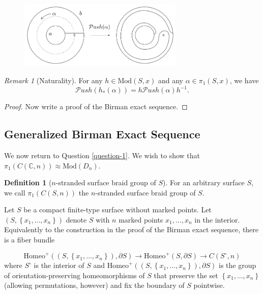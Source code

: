 \documentclass[reqno]{amsart}
\theoremstyle{definition}
\newtheorem{definition}[theorem]{Definition}
\theoremstyle{remark}
\newtheorem*{remark}{Remark}
\newcommand{\Mod}{{\mathrm{Mod}}}
\newcommand{\Homeo}{{\mathrm{Homeo}}}
\newcommand{\Push}{{\mathcal{P}}ush}
\begin{document}
 \begin{figure}[htpb]
     \centering
     \includegraphics[width=0.7\textwidth]{push-point-map.png}
     \label{fig:push-point-map-png}
 \end{figure}

 \begin{remark}[Naturality]
     For any $h \in \Mod (S,x)$ and any
     $\alpha \in \pi_1 \left( S,x \right) $, we have
     \[
     \Push \left( h_* \left( \alpha \right)  \right) 
     = h\Push \left( \alpha \right) h^{-1}.
     \] 
 \end{remark}



 \begin{proof}
     Now write a proof of the Birman exact sequence.
 \end{proof}

 \subsection{Generalized Birman Exact Sequence}

 We now return to Question \ref{question-1}.
 We wish to show that $\pi_1 \left( C
 \left( \mathbb{C},n \right) \right) \approx
 \Mod \left( D_n \right) $. 

 \begin{definition}[$n$-stranded surface braid group of
     $S$]
     For an arbitrary surface $S$, we
     call $\pi_1 \left( C \left( S,n \right)  \right) $ 
     the $n$-stranded surface braid group of $S$.
 \end{definition}

 Let $S$ be a compact finite-type surface without marked
 points. Let $\left( S, \left\{ x_1, \ldots, x_n \right\}  \right) $ 
 denote $S$ with $n$ marked points $x_1, \ldots, x_n$ in
 the interior. Equivalently to the construction
 in the proof of the Birman exact sequence,
 there is a fiber bundle

 \[
 \Homeo^{+} \left( \left( S,
 \left\{ x_1, \ldots, x_n \right\} \right), \partial S  \right) 
 \to \Homeo^{+} \left( S, \partial S \right) 
 \to C \left( S^{\circ},n \right) 
 \]
 where $S^{\circ}$ is the interior of
 $S$ and $\Homeo^{+} \left( \left( S,
 \left\{ x_1,\ldots,x_n \right\} \right) ,\partial S \right) $ 
 is the group of orientation-preserving homeomorphisms
 of $S$ that preserve the set
 $\left\{ x_1,\ldots,x_n \right\} $ (allowing permutations,
 however) and fix the boundary of $S$ pointwise.
\end{document}
